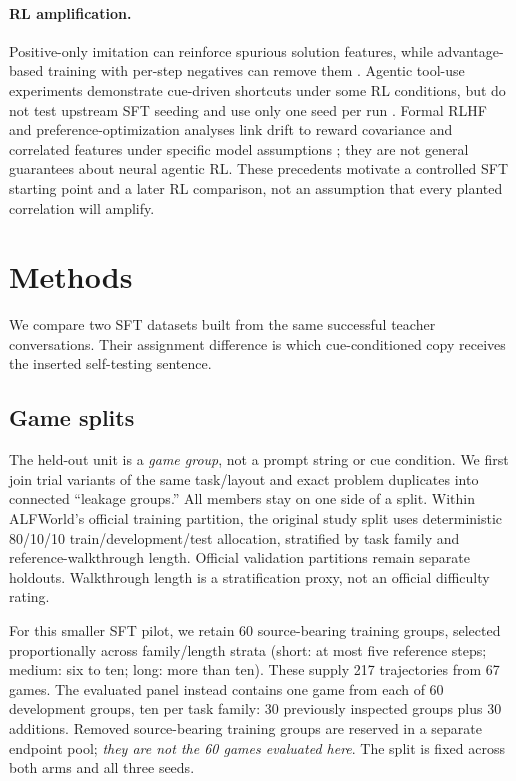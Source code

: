 \documentclass[10pt,letterpaper]{article}
\begin{document}
\paragraph{RL amplification.}
Positive-only imitation can reinforce spurious solution features, while advantage-based training with per-step negatives can remove them \citep{setlur2024incorrect}. Agentic tool-use experiments demonstrate cue-driven shortcuts under some RL conditions, but do not test upstream SFT seeding and use only one seed per run \citep{yang2026spurious}. Formal RLHF and preference-optimization analyses link drift to reward covariance and correlated features under specific model assumptions \citep{shapira2026sycophancy,moya2026spurious}; they are not general guarantees about neural agentic RL. These precedents motivate a controlled SFT starting point and a later RL comparison, not an assumption that every planted correlation will amplify.

\section{Methods}
We compare two SFT datasets built from the same successful teacher conversations. Their assignment difference is which cue-conditioned copy receives the inserted self-testing sentence.

\subsection{Game splits}
The held-out unit is a \emph{game group}, not a prompt string or cue condition. We first join trial variants of the same task/layout and exact problem duplicates into connected ``leakage groups.'' All members stay on one side of a split. Within ALFWorld's official training partition, the original study split uses deterministic 80/10/10 train/development/test allocation, stratified by task family and reference-walkthrough length. Official validation partitions remain separate holdouts. Walkthrough length is a stratification proxy, not an official difficulty rating.

For this smaller SFT pilot, we retain 60 source-bearing training groups, selected proportionally across family/length strata (short: at most five reference steps; medium: six to ten; long: more than ten). These supply 217 trajectories from 67 games. The evaluated panel instead contains one game from each of 60 development groups, ten per task family: 30 previously inspected groups plus 30 additions. Removed source-bearing training groups are reserved in a separate endpoint pool; \emph{they are not the 60 games evaluated here}. The split is fixed across both arms and all three seeds.
\end{document}
